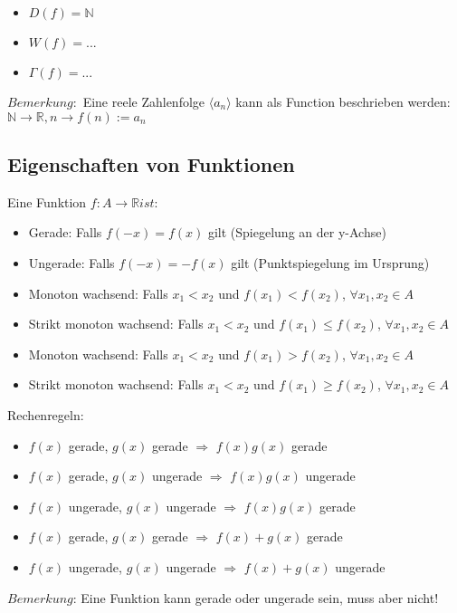 \documentclass[11pt]{article} %
\begin{document}
\begin{itemize}
\item $D(f) = \mathbb{N}$
\item $W(f) = ...$
\item $\Gamma(f) = ...$
\end{itemize}

$Bemerkung:$ Eine reele Zahlenfolge $\langle a_n\rangle$ kann als Function beschrieben werden: $\mathbb{N} \rightarrow \mathbb{R}, n \rightarrow f(n) := a_n$ 

\subsection{Eigenschaften von Funktionen}

Eine Funktion $f: A \rightarrow \mathbb{R} ist$:
\begin{itemize}
\item Gerade: Falls $f(-x) = f(x)$ gilt (Spiegelung an der y-Achse)
\item Ungerade: Falls $f(-x) = -f(x)$ gilt (Punktspiegelung im Ursprung)
\item Monoton wachsend: Falls $x_1 < x_2$ und $f(x_1) < f(x_2)$, $\forall x_1, x_2 \in A$
\item Strikt monoton wachsend: Falls $x_1 < x_2$ und $f(x_1) \leq f(x_2)$, $\forall x_1, x_2 \in A$  
\item Monoton wachsend: Falls $x_1 < x_2$ und $f(x_1) > f(x_2)$, $\forall x_1, x_2 \in A$
\item Strikt monoton wachsend: Falls $x_1 < x_2$ und $f(x_1) \geq f(x_2)$, $\forall x_1, x_2 \in A$\\
\end{itemize}

Rechenregeln:
\begin{itemize}
\item $f(x)$ gerade, $g(x)$ gerade $\Rightarrow$ $f(x)g(x)$ gerade
\item $f(x)$ gerade, $g(x)$ ungerade $\Rightarrow$ $f(x)g(x)$ ungerade 
\item $f(x)$ ungerade, $g(x)$ ungerade $\Rightarrow$ $f(x)g(x)$ gerade
\item $f(x)$ gerade, $g(x)$ gerade $\Rightarrow$ $f(x)+g(x)$ gerade
\item $f(x)$ ungerade, $g(x)$ ungerade $\Rightarrow$ $f(x)+g(x)$ ungerade
\end{itemize}

$Bemerkung$: Eine Funktion kann gerade oder ungerade sein, muss aber nicht!\\
\end{document}
